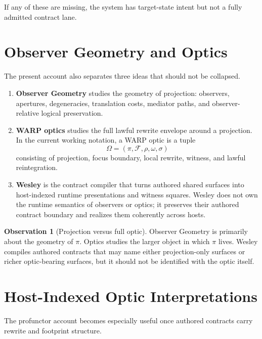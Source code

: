 \documentclass[11pt]{article}
\theoremstyle{definition}
\newtheorem{observation}{Observation}
\begin{document}
If any of these are missing, the system has target-state intent but not a
fully admitted contract lane.

\section{Observer Geometry and Optics}

The present account also separates three ideas that should not be collapsed.

\begin{enumerate}[leftmargin=2em]
\item \textbf{Observer Geometry} studies the geometry of projection:
  observers, apertures, degeneracies, translation costs, mediator paths, and
  observer-relative logical preservation.

\item \textbf{WARP optics} studies the full lawful rewrite envelope around a
  projection. In the current working notation, a WARP optic is a tuple
  \[
  \Omega = (\pi,\mathcal{F},\rho,\omega,\sigma)
  \]
  consisting of projection, focus boundary, local rewrite, witness, and lawful
  reintegration.

\item \textbf{Wesley} is the contract compiler that turns authored shared
  surfaces into host-indexed runtime presentations and witness squares. Wesley
  does not own the runtime semantics of observers or optics; it preserves their
  authored contract boundary and realizes them coherently across hosts.
\end{enumerate}

\begin{observation}[Projection versus full optic]
Observer Geometry is primarily about the geometry of $\pi$.
Optics studies the larger object in which $\pi$ lives.
Wesley compiles authored contracts that may name either projection-only
surfaces or richer optic-bearing surfaces, but it should not be identified
with the optic itself.
\end{observation}

\section{Host-Indexed Optic Interpretations}

The profunctor account becomes especially useful once authored contracts carry
rewrite and footprint structure.
\end{document}
